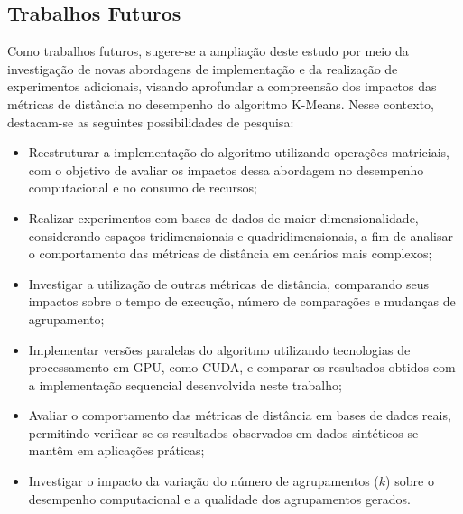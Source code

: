 \documentclass[10pt,a4paper,twocolumn]{article}
\begin{document}
\subsection{Trabalhos Futuros}

Como trabalhos futuros, sugere-se a ampliação deste estudo por meio da investigação de novas abordagens de implementação e da realização de experimentos adicionais, visando aprofundar a compreensão dos impactos das métricas de distância no desempenho do algoritmo K-Means. Nesse contexto, destacam-se as seguintes possibilidades de pesquisa:

\begin{itemize}
\item Reestruturar a implementação do algoritmo utilizando operações matriciais, com o objetivo de avaliar os impactos dessa abordagem no desempenho computacional e no consumo de recursos;

\item Realizar experimentos com bases de dados de maior dimensionalidade, considerando espaços tridimensionais e quadridimensionais, a fim de analisar o comportamento das métricas de distância em cenários mais complexos;

\item Investigar a utilização de outras métricas de distância, comparando seus impactos sobre o tempo de execução, número de comparações e mudanças de agrupamento;

\item Implementar versões paralelas do algoritmo utilizando tecnologias de processamento em GPU, como CUDA, e comparar os resultados obtidos com a implementação sequencial desenvolvida neste trabalho;

\item Avaliar o comportamento das métricas de distância em bases de dados reais, permitindo verificar se os resultados observados em dados sintéticos se mantêm em aplicações práticas;

\item Investigar o impacto da variação do número de agrupamentos ($k$) sobre o desempenho computacional e a qualidade dos agrupamentos gerados.

\end{itemize}




\end{document}
